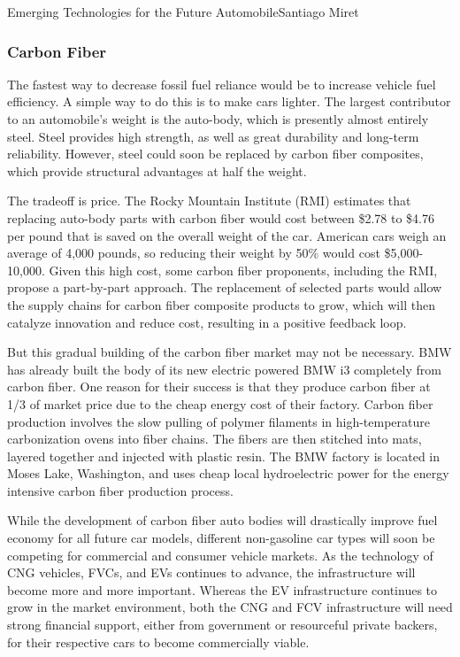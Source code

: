 \documentclass{papertex}
\begin{document}
\begin{news}{2}{Emerging Technologies for the Future Automobile}{Santiago Miret}{}{}
\subsubsection*{Carbon Fiber}

The fastest way to decrease fossil fuel reliance would be to increase vehicle
fuel efficiency. A simple way to do this is to make cars lighter. The largest
contributor to an automobile's weight is the auto-body, which is presently
almost entirely steel. Steel provides high strength, as well as great durability
and long-term reliability. However, steel could soon be replaced by carbon fiber
composites, which provide structural advantages at half the weight.

The tradeoff is price. The Rocky Mountain Institute (RMI) estimates that
replacing auto-body parts with carbon fiber would cost between \$2.78 to \$4.76
per pound that is saved on the overall weight of the car. American cars weigh an
average of 4,000 pounds, so reducing their weight by 50\% would cost
\$5,000-10,000. Given this high cost, some carbon fiber proponents, including
the RMI, propose a part-by-part approach. The replacement of selected parts
would allow the supply chains for carbon fiber composite products to grow, which
will then catalyze innovation and reduce cost, resulting in a positive feedback
loop.

But this gradual building of the carbon fiber market may not be necessary. BMW
has already built the body of its new electric powered BMW i3 completely from
carbon fiber. One reason for their success is that they produce carbon fiber at
1/3 of market price due to the cheap energy cost of their factory. Carbon fiber
production involves the slow pulling of polymer filaments in high-temperature
carbonization ovens into fiber chains. The fibers are then stitched into mats,
layered together and injected with plastic resin. The BMW factory is located in
Moses Lake, Washington, and uses cheap local hydroelectric power for the energy
intensive carbon fiber production process.

While the development of carbon fiber auto bodies will drastically improve fuel
economy for all future car models, different non-gasoline car types will soon be
competing for commercial and consumer vehicle markets. As the technology of CNG
vehicles, FVCs, and EVs continues to advance, the infrastructure will become
more and more important. Whereas the EV infrastructure continues to grow in the
market environment, both the CNG and FCV infrastructure will need strong
financial support, either from government or resourceful private backers, for
their respective cars to become commercially viable.


\end{news}
\end{document}
